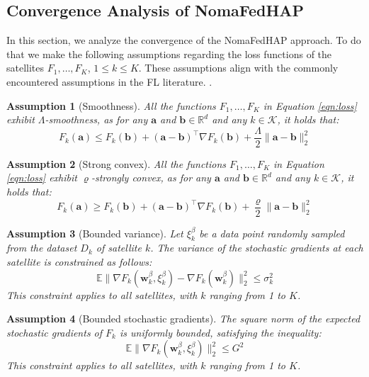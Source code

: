 \documentclass[letter,journal]{IEEEtran}
\newtheorem{asu}{Assumption}
\begin{document}
\subsection{Convergence Analysis of NomaFedHAP}
In this section, we analyze the convergence of the NomaFedHAP approach. To do that we make the following assumptions regarding the loss functions of the satellites $F_1, \ldots, F_K$, $1\leq k\leq K$. These assumptions align with the commonly encountered assumptions in the FL literature. \cite{Li2020On, ribero2022federated}.
\begin{asu}[Smoothness]\label{as:1}
All the functions $F_1, \ldots, F_K$ in Equation \eqref{eqn:loss} exhibit $\Lambda$-smoothness, as for any $\boldsymbol{a}$ and $\boldsymbol{b} \in \mathbb{R}^d$ and any $k \in \mathcal{K}$, it holds that:
$$F_k(\boldsymbol{a})\leq F_k(\boldsymbol{b})+{(\boldsymbol{a}-\boldsymbol{b})}^{\top}\nabla F_{k}(\boldsymbol{b})+\frac{\Lambda}{2}\|\boldsymbol{a}-\boldsymbol{b}\|^2_2$$
\end{asu}
\begin{asu}[Strong convex]\label{as:2}
All the functions $F_1, \ldots, F_K$ in Equation \eqref{eqn:loss} exhibit $\varrho$-strongly convex, as for any $\boldsymbol{a}$ and $\boldsymbol{b} \in \mathbb{R}^d$ and any $k \in \mathcal{K}$, it holds that:
$$F_k(\boldsymbol{a})\geq F_k(\boldsymbol{b})+{(\boldsymbol{a}-\boldsymbol{b})}^{\top}\nabla F_{k}(\boldsymbol{b})+\frac{\varrho}{2}\|\boldsymbol{a}-\boldsymbol{b}\|^2_2$$
\end{asu}
\begin{asu}[Bounded variance]\label{as:3}
Let $\xi_{k}^{\beta}$ be a data point randomly sampled from the dataset $D_k$ of satellite $k$. The variance of the stochastic gradients at each satellite is constrained as follows:
$$\mathbb{E}\|\nabla F_k(\boldsymbol{w}_{k}^\beta,\xi_{k}^{\beta})-\nabla F_{k}(\boldsymbol{w}_{k}^\beta)\|_2^2\leq \sigma_{k}^{2}$$ 
This constraint applies to all satellites, with $k$ ranging from 1 to $K$.
\end{asu}
\begin{asu}[Bounded stochastic gradients]\label{as:4}
The square norm of the expected stochastic gradients of $F_k$ is uniformly bounded, satisfying the inequality:
$$\mathbb{E}\|\nabla F_k(\boldsymbol{w}_{k}^\beta,\xi_{k}^{\beta})\|_2^2\leq G^{2}$$ 
This constraint applies to all satellites, with $k$ ranging from 1 to $K$.
\end{asu}
\end{document}
